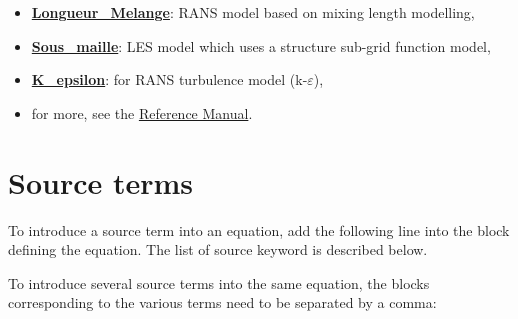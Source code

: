 \begin{itemize}
\item \href{TRUST_Reference_Manual.pdf\#longueurmelange}{\textbf{Longueur\_Melange}}: RANS model based on mixing length modelling,
\item \href{TRUST_Reference_Manual.pdf\#sousmaille}{\textbf{Sous\_maille}}: LES model which uses a structure sub-grid function model,
\item \href{TRUST_Reference_Manual.pdf\#kepsilon}{\textbf{K\_epsilon}}: for RANS turbulence model (k-$\varepsilon$),
\item for more, see the \href{TRUST_Reference_Manual.pdf\#modeleturbulencehydderiv}{\trust Reference Manual}.
\end{itemize}




\section{Source terms}
To introduce a source term into an equation, add the following line into the block defining the equation. The list of source keyword is described below.
    \begin{center}
    \end{center}

To introduce several source terms into the same equation, the blocks corresponding to the various terms need to be separated by a comma:
    \begin{center}
    \end{center}

